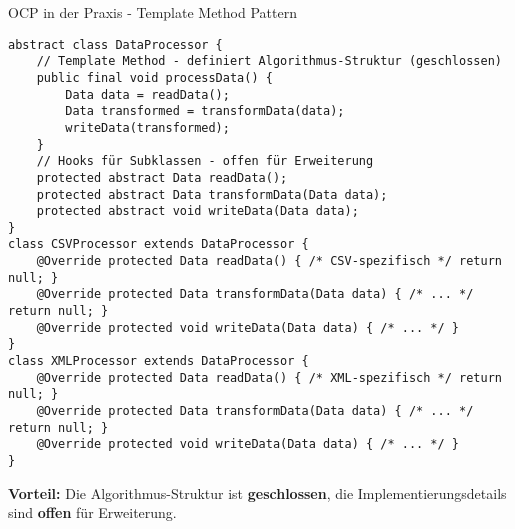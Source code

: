 \begin{frame}[fragile]{OCP in der Praxis - Template Method Pattern}
  \begin{lstlisting}[style=java, basicstyle=\tiny\ttfamily]
abstract class DataProcessor {
    // Template Method - definiert Algorithmus-Struktur (geschlossen)
    public final void processData() {
        Data data = readData();
        Data transformed = transformData(data);
        writeData(transformed);
    }
    // Hooks für Subklassen - offen für Erweiterung
    protected abstract Data readData();
    protected abstract Data transformData(Data data);
    protected abstract void writeData(Data data);
}
class CSVProcessor extends DataProcessor {
    @Override protected Data readData() { /* CSV-spezifisch */ return null; }
    @Override protected Data transformData(Data data) { /* ... */ return null; }
    @Override protected void writeData(Data data) { /* ... */ }
}
class XMLProcessor extends DataProcessor {
    @Override protected Data readData() { /* XML-spezifisch */ return null; }
    @Override protected Data transformData(Data data) { /* ... */ return null; }
    @Override protected void writeData(Data data) { /* ... */ }
}
  \end{lstlisting}
  \textbf{Vorteil:} Die Algorithmus-Struktur ist \textbf{geschlossen}, die Implementierungsdetails sind \textbf{offen} für Erweiterung.
\end{frame}

